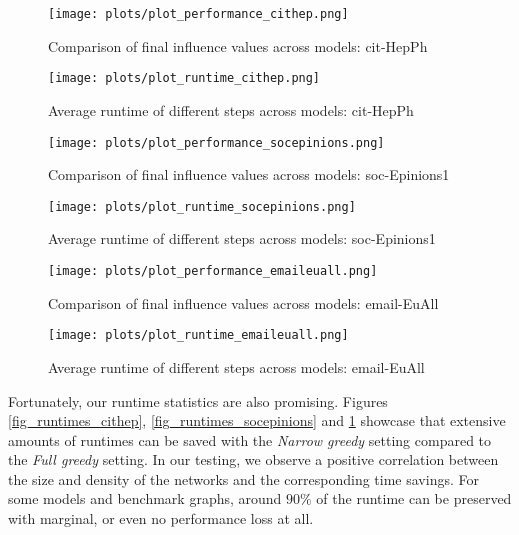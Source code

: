 \documentclass[pdflatex,sn-mathphys-ay]{sn-jnl}
\begin{document}
\begin{figure}[p]
\centering
\begin{minipage}[b]{0.45\textwidth}
\texttt{[image: plots/plot\_performance\_cithep.png]}
\caption{Comparison of final influence values across models: cit-HepPh}
\label{fig_performance_cithep}
\end{minipage}
\hfill
\begin{minipage}[b]{0.45\textwidth}
\texttt{[image: plots/plot\_runtime\_cithep.png]}
\caption{Average runtime of different steps across models: cit-HepPh}
\label{fig_runtimes_cithep}
\end{minipage}
\vspace{5mm}
\centering
\begin{minipage}[b]{0.45\textwidth}
\texttt{[image: plots/plot\_performance\_socepinions.png]}
\caption{Comparison of final influence values across models: soc-Epinions1}
\label{fig_performance_socepinions}
\end{minipage}
\hfill
\begin{minipage}[b]{0.45\textwidth}
\texttt{[image: plots/plot\_runtime\_socepinions.png]}
\caption{Average runtime of different steps across models: soc-Epinions1}
\label{fig_runtimes_socepinions}
\end{minipage}
\vspace{5mm}
\centering
\begin{minipage}[b]{0.45\textwidth}
\texttt{[image: plots/plot\_performance\_emaileuall.png]}
\caption{Comparison of final influence values across models: email-EuAll}
\label{fig_performance_emaileuall}
\end{minipage}
\hfill
\begin{minipage}[b]{0.45\textwidth}
\texttt{[image: plots/plot\_runtime\_emaileuall.png]}
\caption{Average runtime of different steps across models: email-EuAll}
\label{fig_runtimes_emaileuall}
\end{minipage}
\end{figure}

Fortunately, our runtime statistics are also promising. Figures \ref{fig_runtimes_cithep}, \ref{fig_runtimes_socepinions} and \ref{fig_runtimes_emaileuall} showcase that extensive amounts of runtimes can be saved with the \textit{Narrow greedy} setting compared to the \textit{Full greedy} setting. In our testing, we observe a positive correlation between the size and density of the networks and the corresponding time savings. For some models and benchmark graphs, around $90\%$ of the runtime can be preserved with marginal, or even no performance loss at all.
\end{document}
